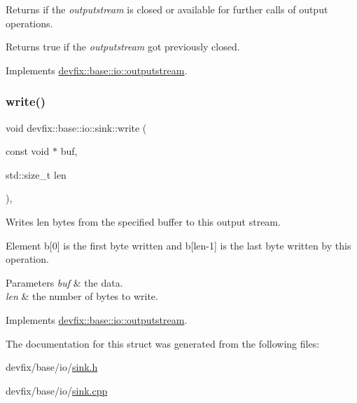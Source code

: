 Returns if the {\itshape outputstream} is closed or available for further calls of output operations. 

\begin{DoxyReturn}{Returns}
true if the {\itshape outputstream} got previously closed. 
\end{DoxyReturn}


Implements \hyperlink{structdevfix_1_1base_1_1io_1_1outputstream_a52bd2eac8f6fbc496eab5138a48d2f06}{devfix\+::base\+::io\+::outputstream}.

\mbox{\label{structdevfix_1_1base_1_1io_1_1sink_ae0edc765741de5514b24ccc17457ec96}} 
\subsubsection{\texorpdfstring{write()}{write()}}
{\footnotesize\ttfamily void devfix\+::base\+::io\+::sink\+::write (\begin{DoxyParamCaption}\item[{const void $\ast$}]{buf,  }\item[{std\+::size\+\_\+t}]{len }\end{DoxyParamCaption})\hspace{0.3cm}{\ttfamily [override]}, {\ttfamily [virtual]}}



Writes len bytes from the specified buffer to this output stream. 

Element b\mbox{[}0\mbox{]} is the first byte written and b\mbox{[}len-\/1\mbox{]} is the last byte written by this operation.


\begin{DoxyParams}{Parameters}
{\em buf} & the data. \\
\hline
{\em len} & the number of bytes to write. \\
\hline
\end{DoxyParams}


Implements \hyperlink{structdevfix_1_1base_1_1io_1_1outputstream_ac7e5fcd6883c7c8f53356a4eb8284c00}{devfix\+::base\+::io\+::outputstream}.



The documentation for this struct was generated from the following files\+:\begin{DoxyCompactItemize}
\item 
devfix/base/io/\hyperlink{sink_8h}{sink.\+h}\item 
devfix/base/io/\hyperlink{sink_8cpp}{sink.\+cpp}\end{DoxyCompactItemize}
